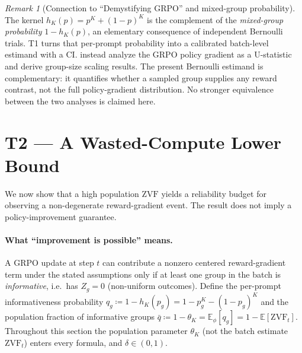 \documentclass[11pt]{article}
\theoremstyle{plain}
\theoremstyle{definition}
\theoremstyle{remark}
\newtheorem{remark}{Remark}
\newcommand{\ZVF}{\ensuremath{\mathrm{ZVF}}}
\newcommand{\E}{\mathbb{E}}
\newcommand{\1}{\mathbb{1}}
\begin{document}
\begin{remark}[Connection to ``Demystifying GRPO'' and mixed-group probability]
\label{rem:connections}
The kernel $h_K(p)=p^K+(1-p)^K$ is the complement of the \emph{mixed-group
probability} $1-h_K(p)$, an elementary consequence of independent Bernoulli
trials. T1 turns that per-prompt probability into a calibrated batch-level
estimand with a CI. \citet{zhou2026demystifyinggrpo} instead analyze the GRPO
policy gradient as a U-statistic and derive group-size scaling results. The
present Bernoulli estimand is complementary: it quantifies whether a sampled
group supplies any reward contrast, not the full policy-gradient distribution.
No stronger equivalence between the two analyses is claimed here.
\end{remark}

\section{T2 --- A Wasted-Compute Lower Bound}\label{sec:T2}
We now show that a high population \ZVF{} yields a reliability budget for
observing a non-degenerate reward-gradient event. The result does not imply a
policy-improvement guarantee.

\paragraph{What ``improvement is possible'' means.} A GRPO update at step $t$
can contribute a nonzero centered reward-gradient term under the stated
assumptions only if at least one group in the batch is
\emph{informative}, i.e.\ has $Z_g=0$ (non-uniform outcomes). Define the
per-prompt informativeness probability $q_g \coloneqq 1-h_K(p_g) =
1-p_g^K-(1-p_g)^K$ and the population fraction of informative groups
$\bar q \coloneqq 1-\theta_K = \E_\phi[q_g] = 1-\E[\ZVF_t]$. Throughout this
section the population parameter $\theta_K$ (not the batch estimate $\ZVF_t$)
enters every formula, and $\delta\in(0,1)$.
\end{document}
